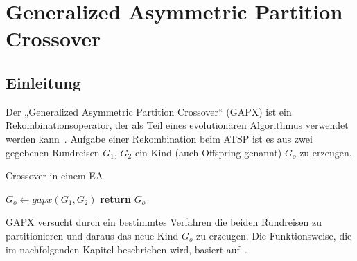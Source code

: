 \chapter{Generalized Asymmetric Partition Crossover}

\section{Einleitung}
Der „Generalized Asymmetric Partition Crossover“ (GAPX) ist ein
Rekombinationsoperator, der als Teil eines evolutionären Algorithmus
verwendet werden kann~\cite{gapx}. Aufgabe einer Rekombination beim ATSP ist es aus
zwei gegebenen Rundreisen $G_1$, $G_2$ ein Kind (auch Offspring genannt)
$G_o$ zu erzeugen.


\begin{algorithm}
\caption{Crossover in einem EA}\label{alg:crossover_ea}
\begin{algorithmic}[1]
\Comment{}
\State $G_o\gets gapx(G_1,G_2)$
\State \textbf{return} $G_o$
\EndProcedure
\end{algorithmic}
\end{algorithm}
GAPX versucht durch ein bestimmtes Verfahren die beiden Rundreisen zu
partitionieren und daraus das neue Kind $G_o$ zu erzeugen. Die
Funktionsweise, die im nachfolgenden Kapitel beschrieben wird, basiert
auf~\cite{gapx}.


